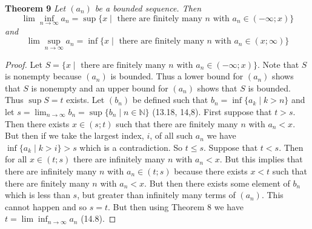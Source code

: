 \documentclass{article}
\begin{document}
\begin{flushleft}
\textbf{Theorem 9}
\textsl{Let $(a_n)$ be a bounded sequence. Then
\[
\lim \inf_{n \rightarrow \infty} a_n = \sup \{x \mid \text{ there are finitely many $n$ with $a_n \in (-\infty ; x)$} \}
\]
and
\[
\lim \sup_{n \rightarrow \infty} a_n = \inf \{x \mid \text{ there are finitely many $n$ with $a_n \in (x ; \infty)$} \}
\]}
\begin{proof}
Let $S = \{x \mid \text{ there are finitely many $n$ with $a_n \in (-\infty ; x)$} \}$. Note that $S$ is nonempty because $(a_n)$ is bounded. Thus a lower bound for $(a_n)$ shows that $S$ is nonempty and an upper bound for $(a_n)$ shows that $S$ is bounded. Thus $\sup S = t$ exists. Let $(b_n)$ be defined such that $b_n = \inf \{a_k \mid k > n\}$ and let $s = \lim_{n \rightarrow \infty} b_n = \sup \{b_n \mid n \in \mathbb{N}\}$ (13.18, 14,8). First suppose that $t > s$. Then there exists $x \in (s;t)$ such that there are finitely many $n$ with $a_n < x$. But then if we take the largest index, $i$, of all such $a_n$ we have $\inf \{a_k \mid k > i\} > s$ which is a contradiction. So $t \leq s$. Suppose that $t < s$. Then for all $x \in (t;s)$ there are infinitely many $n$ with $a_n < x$. But this implies that there are infinitely many $n$ with $a_n \in (t;s)$ because there exists $x < t$ such that there are finitely many $n$ with $a_n < x$. But then there exists some element of $b_n$ which is less than $s$, but greater than infinitely many terms of $(a_n)$. This cannot happen and so $s=t$. But then using Theorem 8 we have $t = \lim \inf_{n \rightarrow \infty} a_n$ (14.8).
\end{proof}

\end{flushleft}
\end{document}
